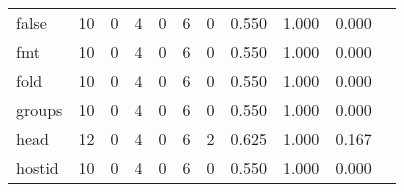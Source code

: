 \begin{longtable}{lp{1.2cm}p{1.2cm}p{1.2cm}p{1.2cm}p{1.2cm}p{1.2cm}p{1.2cm}p{1.2cm}p{1.2cm}p{1.2cm}}
false     &                                    10 &                                                  0 &                                                  4 &                                                  0 &                                                  6 &                                                  0 &                                              0.550 &                                              1.000 &                                              0.000 \\
fmt       &                                    10 &                                                  0 &                                                  4 &                                                  0 &                                                  6 &                                                  0 &                                              0.550 &                                              1.000 &                                              0.000 \\
fold      &                                    10 &                                                  0 &                                                  4 &                                                  0 &                                                  6 &                                                  0 &                                              0.550 &                                              1.000 &                                              0.000 \\
groups    &                                    10 &                                                  0 &                                                  4 &                                                  0 &                                                  6 &                                                  0 &                                              0.550 &                                              1.000 &                                              0.000 \\
head      &                                    12 &                                                  0 &                                                  4 &                                                  0 &                                                  6 &                                                  2 &                                              0.625 &                                              1.000 &                                              0.167 \\
hostid    &                                    10 &                                                  0 &                                                  4 &                                                  0 &                                                  6 &                                                  0 &                                              0.550 &                                              1.000 &                                              0.000 \\

\end{longtable}

